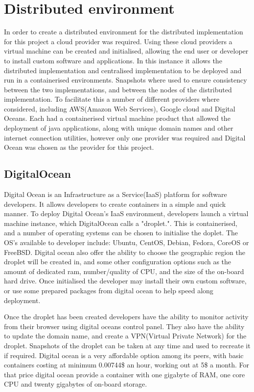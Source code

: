 \documentclass[oneside,12pt]{book}
\begin{document}
\section{Distributed environment}
In order to create a distributed environment for the distributed implementation for this project a cloud provider was required. Using these cloud providers a virtual machine can be created and initialised, allowing the end user or developer to install custom software and applications. In this instance it allows the distributed implementation and centralised implementation to be deployed and run in a containerised environments. Snapshots where used to ensure consistency between the two implementations, and between the nodes of the distributed implementation. To facilitate this a number of different providers where considered, including AWS(Amazon Web Services), Google cloud and Digital Oceans. Each had a containerised virtual machine product that allowed the deployment of java applications, along with unique domain names and other internet connection utilities, however only one provider was required and Digital Ocean was chosen as the provider for this project. 

\subsection{DigitalOcean}
Digital Ocean is an Infrastructure as a Service(IaaS) platform for software developers. It allows developers to create containers in a simple and quick manner. To deploy Digital Ocean's IaaS environment, developers launch a virtual machine instance, which DigitalOcean calls a "droplet.". This is containerised, and a number of operating systems can be chosen to initialise the doplet. The OS's available to developer include: Ubuntu, CentOS, Debian, Fedora, CoreOS or FreeBSD. Digital ocean also offer the ability to choose the geographic region the droplet will be created in, and some other configuration options such as the amount of dedicated ram, number/quality of CPU, and the size of the on-board hard drive. Once initialised the developer may install their own custom software, or use some prepared packages from digital ocean to help speed along deployment. 

Once the droplet has been created developers have the ability to monitor activity from their browser using digital oceans control panel. They also have the ability to update the domain name, and create a VPN(Virtual Private Network) for the droplet. Snapshots of the droplet can be taken at any time and used to recreate it if required. Digital ocean is a very affordable option among its peers, with basic containers costing at minimum 0.00744\$ an hour, working out at 5\$ a month. For that price digital ocean provide a container with one gigabyte of RAM, one core CPU and twenty gigabytes of on-board storage.
\end{document}
